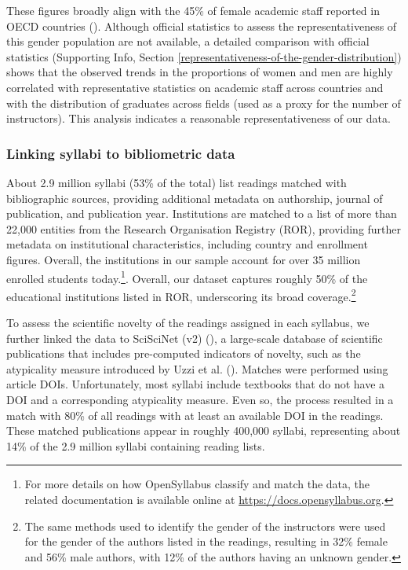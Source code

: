 \documentclass[
  british,
  11pt,
]{article}
\begin{document}
These figures broadly align with the 45\% of female academic staff reported in OECD countries (). Although official statistics to assess the representativeness of this gender population are not available, a detailed comparison with official statistics (Supporting Info, Section \ref{representativeness-of-the-gender-distribution}) shows that the observed trends in the proportions of women and men are highly correlated with representative statistics on academic staff across countries and with the distribution of graduates across fields (used as a proxy for the number of instructors). This analysis indicates a reasonable representativeness of our data.

\subsubsection{Linking syllabi to bibliometric data}\label{linking-syllabi-to-bibliometric-data}

About 2.9 million syllabi (53\% of the total) list readings matched with bibliographic sources, providing additional metadata on authorship, journal of publication, and publication year. Institutions are matched to a list of more than 22,000 entities from the Research Organisation Registry (ROR), providing further metadata on institutional characteristics, including country and enrollment figures. Overall, the institutions in our sample account for over 35 million enrolled students today.\footnote{
  For more details on how OpenSyllabus classify and match the data, the related documentation is available online at \url{https://docs.opensyllabus.org}.}. Overall, our dataset captures roughly 50\% of the educational institutions listed in ROR, underscoring its broad coverage.\footnote{
  The same methods used to identify the gender of the instructors were used for the gender of the authors listed in the readings, resulting in 32\% female and 56\% male authors, with 12\% of the authors having an unknown gender.}

To assess the scientific novelty of the readings assigned in each syllabus, we further linked the data to SciSciNet (v2) (), a large-scale database of scientific publications that includes pre-computed indicators of novelty, such as the atypicality measure introduced by Uzzi et al. (). Matches were performed using article DOIs. Unfortunately, most syllabi include textbooks that do not have a DOI and a corresponding atypicality measure. Even so, the process resulted in a match with 80\% of all readings with at least an available DOI in the readings. These matched publications appear in roughly 400,000 syllabi, representing about 14\% of the 2.9 million syllabi containing reading lists.
\end{document}
